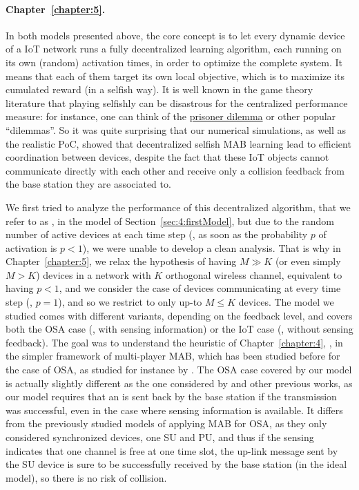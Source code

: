 \paragraph{Chapter~\ref{chapter:5}.}
%
In both models presented above, the core concept is to let every dynamic device of a IoT network runs a fully decentralized learning algorithm, each running on its own (random) activation times, in order to optimize the complete system.
It means that each of them target its own local objective, which is to maximize its cumulated reward (in a selfish way).
It is well known in the game theory literature that playing selfishly can be disastrous for the centralized performance measure: for instance, one can think of the \href{https://en.wikipedia.org/wiki/Prisoner%27s_dilemma}{prisoner dilemma} or other popular ``dilemmas''.
So it was quite surprising that our numerical simulations, as well as the realistic PoC, showed that decentralized selfish MAB learning lead to efficient coordination between devices, despite the fact that these IoT objects cannot communicate directly with each other and receive only a collision feedback from the base station they are associated to.

We first tried to analyze the performance of this decentralized algorithm, that we refer to as \Selfish, in the model of Section~\ref{sec:4:firstModel},
but due to the random number of active devices at each time step (\ie, as soon as the probability $p$ of activation is $p < 1$), we were unable to develop a clean analysis.
%
That is why in Chapter~\ref{chapter:5}, we relax the hypothesis of having $M \gg K$ (or even simply $M > K$) devices in a network with $K$ orthogonal wireless channel, equivalent to having $p < 1$, and we consider the case of devices communicating at every time step (\ie, $p=1$), and so we restrict to only up-to $M \leq K$ devices.
The model we studied comes with different variants, depending on the feedback level, and covers both the OSA case (\ie, with sensing information) or the IoT case (\ie, without sensing feedback).
The goal was to understand the heuristic of Chapter~\ref{chapter:4}, \Selfish, in the simpler framework of multi-player MAB, which has been studied before for the case of OSA, as studied for instance by \cite{Zhao10,Anandkumar10,Anandkumar11}.
%
The OSA case covered by our model is actually slightly different as the one considered by \cite{Jouini10} and other previous works,
as our model requires that an \Ack{} is sent back by the base station if the transmission was successful, even in the case where sensing information is available.
It differs from the previously studied models of applying MAB for OSA, as they only considered synchronized devices, one SU and PU, and thus if the sensing indicates that one channel is free at one time slot, the up-link message sent by the SU device is sure to be successfully received by the base station (in the ideal model), so there is no risk of collision.


